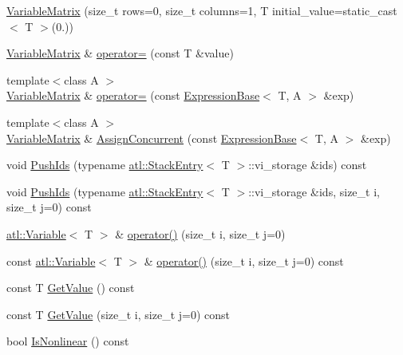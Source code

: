 \begin{DoxyCompactItemize}
\item 
\hyperlink{structatl_1_1_variable_matrix_af656ffe0e832bf82e4d4246c4fae3058}{Variable\+Matrix} (size\+\_\+t rows=0, size\+\_\+t columns=1, T initial\+\_\+value=static\+\_\+cast$<$ T $>$(0.))
\item 
\hyperlink{structatl_1_1_variable_matrix}{Variable\+Matrix} \& \hyperlink{structatl_1_1_variable_matrix_ac83b3849f3f3e984819716b69596fe63}{operator=} (const T \&value)
\item 
{\footnotesize template$<$class A $>$ }\\\hyperlink{structatl_1_1_variable_matrix}{Variable\+Matrix} \& \hyperlink{structatl_1_1_variable_matrix_adfaf4a2ae2591236e5df9d96aaa19783}{operator=} (const \hyperlink{structatl_1_1_expression_base}{Expression\+Base}$<$ T, A $>$ \&exp)
\item 
{\footnotesize template$<$class A $>$ }\\\hyperlink{structatl_1_1_variable_matrix}{Variable\+Matrix} \& \hyperlink{structatl_1_1_variable_matrix_a042ca0e4a046575dbe471fd107526bcb}{Assign\+Concurrent} (const \hyperlink{structatl_1_1_expression_base}{Expression\+Base}$<$ T, A $>$ \&exp)
\item 
void \hyperlink{structatl_1_1_variable_matrix_a467767c1d7a162b3ec0d56c85f05822e}{Push\+Ids} (typename \hyperlink{structatl_1_1_stack_entry}{atl\+::\+Stack\+Entry}$<$ T $>$\+::vi\+\_\+storage \&ids) const 
\item 
void \hyperlink{structatl_1_1_variable_matrix_a87472f5b1f82f7b977d94fe9172e7d28}{Push\+Ids} (typename \hyperlink{structatl_1_1_stack_entry}{atl\+::\+Stack\+Entry}$<$ T $>$\+::vi\+\_\+storage \&ids, size\+\_\+t i, size\+\_\+t j=0) const 
\item 
\hyperlink{structatl_1_1_variable}{atl\+::\+Variable}$<$ T $>$ \& \hyperlink{structatl_1_1_variable_matrix_a949002e9718e5c89afa7566a92d92103}{operator()} (size\+\_\+t i, size\+\_\+t j=0)
\item 
const \hyperlink{structatl_1_1_variable}{atl\+::\+Variable}$<$ T $>$ \& \hyperlink{structatl_1_1_variable_matrix_a6d873cfa56fe801abb7a53b22d36f081}{operator()} (size\+\_\+t i, size\+\_\+t j=0) const 
\item 
const T \hyperlink{structatl_1_1_variable_matrix_ad94d8c617309904428255343e7c0ba3e}{Get\+Value} () const 
\item 
const T \hyperlink{structatl_1_1_variable_matrix_aadaa361a31a643b56c16dcaf912a4b45}{Get\+Value} (size\+\_\+t i, size\+\_\+t j=0) const 
\item 
bool \hyperlink{structatl_1_1_variable_matrix_a5dd3b0548d277b4643f4953d9ec200f2}{Is\+Nonlinear} () const 

\end{DoxyCompactItemize}
